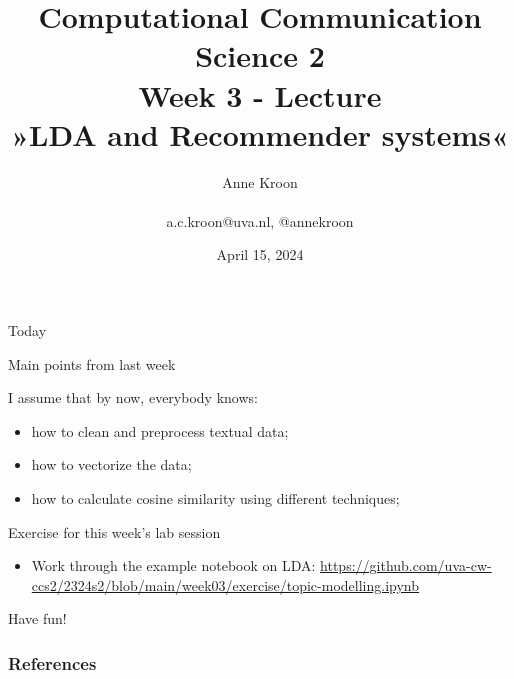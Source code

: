\documentclass[handout]{beamer}
\title[Computational Communication Science 2]{\textbf{Computational Communication Science 2} \\Week 3 - Lecture\\ »LDA and Recommender systems«}
\author[Anne Kroon]{Anne Kroon \\ ~ \\ \footnotesize{ a.c.kroon@uva.nl, @annekroon} \\}
\date{April 15, 2024}
\institute[Digital Society Minor, University of Amsterdam]{Digital Society Minor, University of Amsterdam}
\begin{document}
	
	\begin{frame}{}
		\titlepage
	\end{frame}
	
	\begin{frame}{Today}
		\begin{tiny}
		\tableofcontents
		\end{tiny}
	\end{frame}



	\begin{frame}{Main points from last week}
		\begin{alertblock}{I assume that by now, everybody knows:}
			\begin{itemize}[<+>]
				\item how to clean and preprocess textual data;
				\item how to vectorize the data;
				\item how to calculate cosine similarity using different techniques;
			\end{itemize}
		\end{alertblock}
	\end{frame}



\begin{frame}[plain]
	
	\begin{block}{Exercise for this week's lab session}
		\footnotesize
		\begin{itemize}
			\item Work through the example notebook on LDA: \url{https://github.com/uva-cw-ccs2/2324s2/blob/main/week03/exercise/topic-modelling.ipynb}
			\end{itemize}
	\end{block}
\end{frame}



\begin{frame}[standout]
Have fun!
\end{frame}

\begin{frame}[t,allowframebreaks]
	\frametitle{References}
	\printbibliography
\end{frame}
\end{document}
